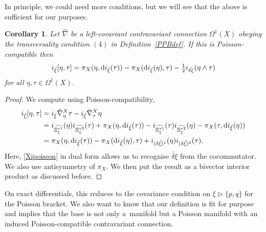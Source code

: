 \documentclass[pdftex]{sigma}
\numberwithin{equation}{section}
\newtheorem{Corollary}[Theorem]{Corollary}
\newcommand{\<}{{\langle}}
\renewcommand{\>}{{\rangle}}
\newcommand{\extd}{{\rm d}}
\newcommand{\la}{{\triangleright}}
\begin{document}
In principle, we could need more conditions, but we will see that the above is sufficient for our purposes.


\begin{Corollary}\label{corintsch} Let $\hat\nabla$ be a left-covariant contravariant connection $\Omega^1(X)$ obeying the transversality condition $(4)$ in Definition~{\rm \ref{PPBdef}}. If this is Poisson-compatible then
\begin{equation*}%
i_{\tilde\xi}[\eta,\tau]= \pi_X(\eta,\extd i_{\tilde\xi}(\tau))-\pi_X(\extd i_{\tilde\xi}(\eta),\tau)-\tfrac{1}{2} i_{\tilde{\delta\xi}}(\eta\wedge\tau)\end{equation*}
for all $\eta,\tau\in \Omega^1(X)$.
\end{Corollary}
\begin{proof} We compute using Poisson-compatibility,
\begin{align*}
i_{\tilde\xi}[\eta,\tau]& =i_{\tilde\xi}\hat{\nabla}^X_{\eta}\tau-i_{\tilde\xi}\hat{\nabla}^X_{\tau}\eta\\
& =i_{\widetilde{\Xi^{*1}_\xi}}(\eta)i_{\widetilde{\Xi^{*2}_\xi}}(\tau)+\pi_X(\eta,\extd i_{\tilde\xi}(\tau))- i_{\widetilde{\Xi^{*1}_\xi}}(\tau)i_{\widetilde{\Xi^{*2}_\xi}}(\eta)-\pi_X(\tau,\extd i_{\tilde\xi}(\eta))\\
&= \pi_X(\eta,\extd i_{\tilde\xi}(\tau))-\pi_X(\extd i_{\tilde\xi}(\eta),\tau)+i_{(\tilde{\delta\xi)^1}}(\eta)i_{(\tilde{\delta\xi)^2}}(\tau).\end{align*}
Here, \eqref{Xipoisson} in dual form allows us to recognise $\tilde{\delta\xi}$ from the cocommutator. We also use antisymmetry of $\pi_X$. We then put the result as a bivector interior product as discussed before.
\end{proof}

On exact differentials, this reduces to the covariance condition on $\xi\la\{p,q\}$ for the Poisson bracket. We also want to know that our definition is fit for purpose and implies that the base is not only a~manifold but a Poisson manifold with an induced Poisson-compatible contravariant connection.
\end{document}
